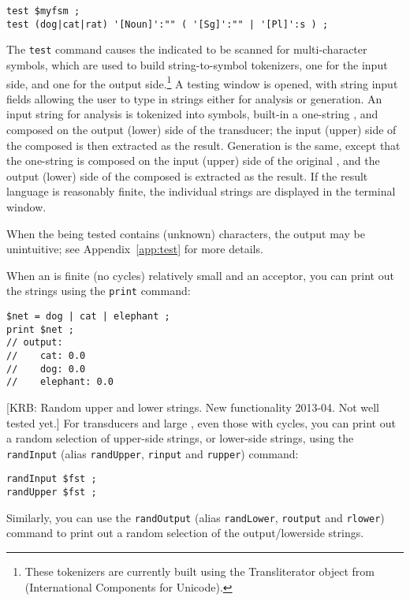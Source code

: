 \begin{Verbatim}
test $myfsm ;
test (dog|cat|rat) '[Noun]':"" ( '[Sg]':"" | '[Pl]':s ) ;
\end{Verbatim}

\noindent
The \texttt{test} command causes the indicated \fsm{} to be scanned for
multi-character symbols, which are used to build 
string-to-symbol tokenizers, one for the input side, and one for
the output side.\footnote{These tokenizers are currently
built using the Transliterator object from  (International
Components for Unicode).}  A testing window is opened, with string
input fields allowing the user to type in strings either for
analysis or generation.  An input string for analysis is tokenized
into symbols, built-in a one-string \fsm{}, and composed on the
output (lower) side of the transducer; the input (upper) side of
the composed \fsm{} is then extracted as the result.  Generation
is the same, except that the one-string \fsm{} is composed on the
input (upper) side of the original \fsm{}, and the output (lower)
side of the composed \fsm{} is extracted as the result.  If the
result language is reasonably finite, the individual strings are
displayed in the terminal window.

When the \fsm{} being tested contains  (unknown) characters,
the output may be unintuitive; see Appendix~\ref{app:test} for more
details.

When an \fsm{} is finite (no cycles) relatively small and an acceptor, you can print out
the strings using the \texttt{print} command:

\begin{Verbatim}
$net = dog | cat | elephant ;
print $net ;
// output:
//    cat: 0.0
//    dog: 0.0
//    elephant: 0.0
\end{Verbatim}

[KRB:  Random upper and lower strings.  New functionality 2013-04.  Not well tested yet.]
For transducers and large \fst{}, even those with cycles, you can print out a random
selection of upper-side strings, or lower-side strings, using the \texttt{randInput} (alias
\texttt{randUpper}, \texttt{rinput} and \texttt{rupper}) command:

\begin{Verbatim}
randInput $fst ;
randUpper $fst ;
\end{Verbatim}

\noindent
Similarly, you can use the \texttt{randOutput} (alias \texttt{randLower}, \texttt{routput}
and \texttt{rlower}) command to print out a random selection of the output/lowerside
strings.

